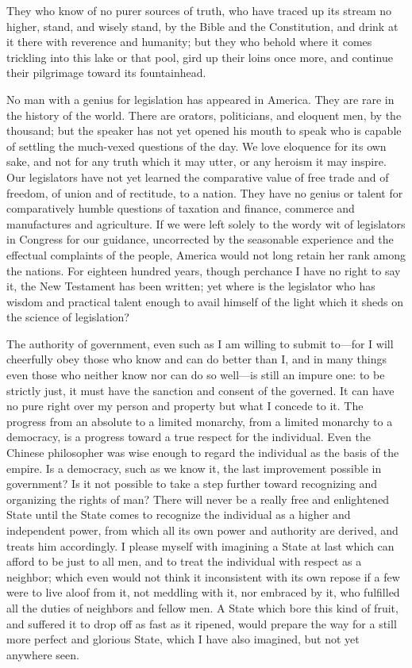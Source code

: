 \documentclass[letterpaper,12pt]{article}
\begin{document}
They who know of no purer sources of truth, who have traced up its stream no
higher, stand, and wisely stand, by the Bible and the Constitution, and drink at
it there with reverence and humanity; but they who behold where it comes
trickling into this lake or that pool, gird up their loins once more, and
continue their pilgrimage toward its fountainhead.

No man with a genius for legislation has appeared in America. They are rare in
the history of the world. There are orators, politicians, and eloquent men, by
the thousand; but the speaker has not yet opened his mouth to speak who is
capable of settling the much-vexed questions of the day. We love eloquence for
its own sake, and not for any truth which it may utter, or any heroism it may
inspire. Our legislators have not yet learned the comparative value of free
trade and of freedom, of union and of rectitude, to a nation. They have no
genius or talent for comparatively humble questions of taxation and finance,
commerce and manufactures and agriculture. If we were left solely to the wordy
wit of legislators in Congress for our guidance, uncorrected by the seasonable
experience and the effectual complaints of the people, America would not long
retain her rank among the nations. For eighteen hundred years, though perchance
I have no right to say it, the New Testament has been written; yet where is the
legislator who has wisdom and practical talent enough to avail himself of the
light which it sheds on the science of legislation?

The authority of government, even such as I am willing to submit to---for I will
cheerfully obey those who know and can do better than I, and in many things even
those who neither know nor can do so well---is still an impure one: to be
strictly just, it must have the sanction and consent of the governed. It can
have no pure right over my person and property but what I concede to it. The
progress from an absolute to a limited monarchy, from a limited monarchy to
a democracy, is a progress toward a true respect for the individual. Even the
Chinese philosopher was wise enough to regard the individual as the basis of the
empire. Is a democracy, such as we know it, the last improvement possible in
government? Is it not possible to take a step further toward recognizing and
organizing the rights of man? There will never be a really free and enlightened
State until the State comes to recognize the individual as a higher and
independent power, from which all its own power and authority are derived, and
treats him accordingly. I please myself with imagining a State at last which can
afford to be just to all men, and to treat the individual with respect as
a neighbor; which even would not think it inconsistent with its own repose if
a few were to live aloof from it, not meddling with it, nor embraced by it, who
fulfilled all the duties of neighbors and fellow men. A State which bore this
kind of fruit, and suffered it to drop off as fast as it ripened, would prepare
the way for a still more perfect and glorious State, which I have also imagined,
but not yet anywhere seen.
\end{document}
